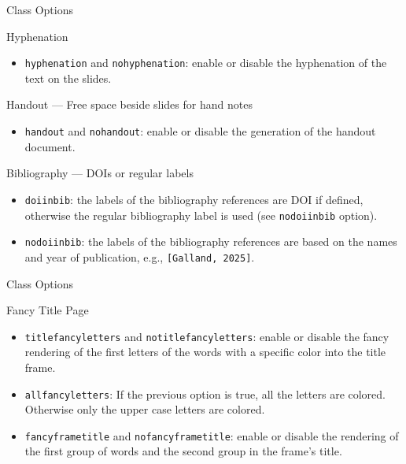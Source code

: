 \documentclass[english,sectioncirclenumberstyle]{ciadbeamer}
\begin{document}
\begin{frame}[t]{Class Options \insertcontinuationtext}
	\begin{block}{Hyphenation}
		\begin{itemize}
		\item \texttt{hyphenation} and \texttt{nohyphenation}: enable or disable the hyphenation of the text on the slides.
		\end{itemize}
	\end{block}
	\begin{block}{Handout --- Free space beside slides for hand notes}
		\begin{itemize}
		\item \texttt{handout} and \texttt{nohandout}: enable or disable the generation of the handout document.
		\end{itemize}
	\end{block}
	\begin{block}{Bibliography --- DOIs or regular labels}
		\begin{itemize}
		\item \texttt{doiinbib}: the labels of the bibliography references are DOI if defined, otherwise the regular bibliography label is used (see \texttt{nodoiinbib} option).
		\item \texttt{nodoiinbib}: the labels of the bibliography references are based on the names and year of publication, e.g., \texttt{[Galland, 2025]}.
		\end{itemize}
	\end{block}
\end{frame}

\begin{frame}[t]{Class Options \insertcontinuationtext}
	\begin{block}{Fancy Title Page}
		\begin{itemize}
		\item \texttt{titlefancyletters} and \texttt{notitlefancyletters}: enable or disable the fancy rendering of the first letters of the words with a specific color into the title frame.
		\item \texttt{allfancyletters}: If the previous option is true, all the letters are colored. Otherwise only the upper case letters are colored.
		\item \texttt{fancyframetitle} and \texttt{nofancyframetitle}: enable or disable the rendering of the first group of words and the second group in the frame's title.
		\end{itemize}
	\end{block}
\end{frame}
\end{document}
